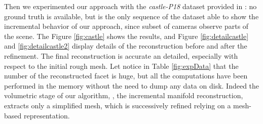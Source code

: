 Then we experimented our approach with the \emph{castle-P18} dataset provided in \cite{strecha2008}: no ground truth is available, but is the only sequence of the dataset able to show the incremental behavior of our approach, since subset of cameras observe parts of the scene. 
The Figure \ref{fig:castle} shows the results, and Figure \ref{fig:detailcastle} and \ref{fig:detailcastle2} display details of the reconstruction before and after the refinement. The final reconstruction is accurate  an detailed, especially with respect to the initial rough mesh.
Let notice in Table \ref{fig:expData} that the number of the reconstructed facet is huge, but all the computations have been performed in the memory without the need to dump any data on disk. Indeed the volumetric stage of our algorithm, \ie, the incremental manifold reconstruction, extracts only a  simplified mesh, which is successively refined relying on a mesh-based representation.



